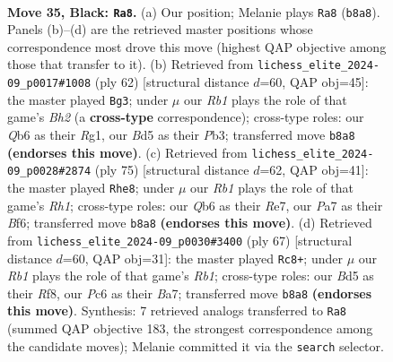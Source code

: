 \documentclass[11pt]{article}
\begin{document}
\clearpage

\begin{figure}[p]\centering
\begin{subfigure}{0.46\textwidth}\centering
\resizebox{\linewidth}{!}{%
\newchessgame
\chessboard[
  setfen={1rk3r1/p3Qp1p/1qp5/2Nb4/3P4/6PP/5P2/2R3K1 b - - 2 35},
  showmover=false,
  pgfstyle=straightmove, color=movearrow, markmove={b8-a8}
]}
\caption{}
\end{subfigure}\hfill
\begin{subfigure}{0.46\textwidth}\centering
\resizebox{\linewidth}{!}{%
\newchessgame
\chessboard[
  setfen={5r1k/p5p1/2p5/5P1p/4P1n1/1P3Q2/1PPq3B/6RK w - - 3 32},
  showmover=false,
  pgfstyle=straightmove, color=movearrow, markmove={h2-g3}
]}
\caption{}
\end{subfigure}
\\[4pt]
\begin{subfigure}{0.46\textwidth}\centering
\resizebox{\linewidth}{!}{%
\newchessgame
\chessboard[
  setfen={7r/4rq1k/4Nbpp/3Q1p2/1p6/4R2P/1P4P1/7K b - - 1 38},
  showmover=false,
  pgfstyle=straightmove, color=movearrow, markmove={h8-e8}
]}
\caption{}
\end{subfigure}\hfill
\begin{subfigure}{0.46\textwidth}\centering
\resizebox{\linewidth}{!}{%
\newchessgame
\chessboard[
  setfen={1r2kr2/bp3p2/p2P1Q2/4p3/8/4qN2/2K3PP/8 b - - 0 34},
  showmover=false,
  pgfstyle=straightmove, color=movearrow, markmove={b8-c8}
]}
\caption{}
\end{subfigure}
\caption{\textbf{Move 35, Black: \texttt{Ra8}.} (a) Our position; Melanie plays \texttt{Ra8} (\texttt{b8a8}). Panels (b)--(d) are the retrieved master positions whose correspondence most drove this move (highest QAP objective among those that transfer to it). (b) Retrieved from \texttt{lichess\_elite\_2024-09\_p0017\#1008} (ply 62) [structural distance $d$=60, QAP obj=45]: the master played \texttt{Bg3}; under $\mu$ our \emph{Rb1} plays the role of that game's \emph{Bh2} (a \textbf{cross-type} correspondence); cross-type roles: our \emph{Q}b6 as their \emph{R}g1, our \emph{B}d5 as their \emph{P}b3; transferred move \texttt{b8a8} \textbf{(endorses this move)}. (c) Retrieved from \texttt{lichess\_elite\_2024-09\_p0028\#2874} (ply 75) [structural distance $d$=62, QAP obj=41]: the master played \texttt{Rhe8}; under $\mu$ our \emph{Rb1} plays the role of that game's \emph{Rh1}; cross-type roles: our \emph{Q}b6 as their \emph{R}e7, our \emph{P}a7 as their \emph{B}f6; transferred move \texttt{b8a8} \textbf{(endorses this move)}. (d) Retrieved from \texttt{lichess\_elite\_2024-09\_p0030\#3400} (ply 67) [structural distance $d$=60, QAP obj=31]: the master played \texttt{Rc8+}; under $\mu$ our \emph{Rb1} plays the role of that game's \emph{Rb1}; cross-type roles: our \emph{B}d5 as their \emph{R}f8, our \emph{P}c6 as their \emph{B}a7; transferred move \texttt{b8a8} \textbf{(endorses this move)}. Synthesis: 7 retrieved analogs transferred to \texttt{Ra8} (summed QAP objective 183, the strongest correspondence among the candidate moves); Melanie committed it via the \texttt{search} selector.}
\label{fig:thought-m69}
\end{figure}
\end{document}
